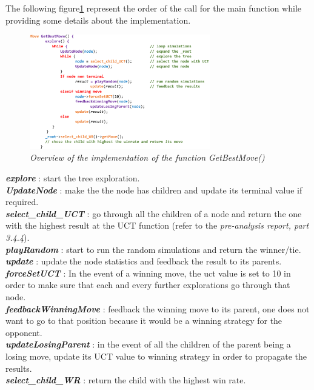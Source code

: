 The following figure\ref{fig:MCTSAlgorithm} represent the order of the call for the main function while providing some details about the implementation.
\begin{figure}[H]
\centerline{\includegraphics[width=0.7\textwidth]{Base_Algorithm/Img/Algorithm.png}}
\caption{\label{fig:MCTSAlgorithm}\textit{Overview of the implementation of the function GetBestMove()}}
\end{figure}
\noindent
\textit{\textbf{explore}} : start the tree exploration.
\medskip\\
\textit{\textbf{UpdateNode}} : make the the node has children and update its terminal value if required.
\medskip\\
\textit{\textbf{select\_child\_UCT}} : go through all the children of a node and return the one with the highest result at the UCT function (refer to the \textit{pre-analysis report, part 3.4.4}).
\medskip\\
\textit{\textbf{playRandom}} : start to run the random simulations and return the winner/tie.
\medskip\\
\textit{\textbf{update}} : update the node statistics and feedback the result to its parents.
\medskip\\
\textit{\textbf{forceSetUCT}} : In the event of a winning move, the uct value is set to 10 in order to make sure that each and every further explorations go through that node.
\medskip\\
\textit{\textbf{feedbackWinningMove}} : feedback the winning move to its parent, one does not want to go to that position because it would be a winning strategy for the opponent.
\medskip\\
\textit{\textbf{updateLosingParent}} : in the event of all the children of the parent being a losing move, update its UCT value to winning strategy in order to propagate the results.
\medskip\\
\textit{\textbf{select\_child\_WR}} : return the child with the highest win rate.\\
